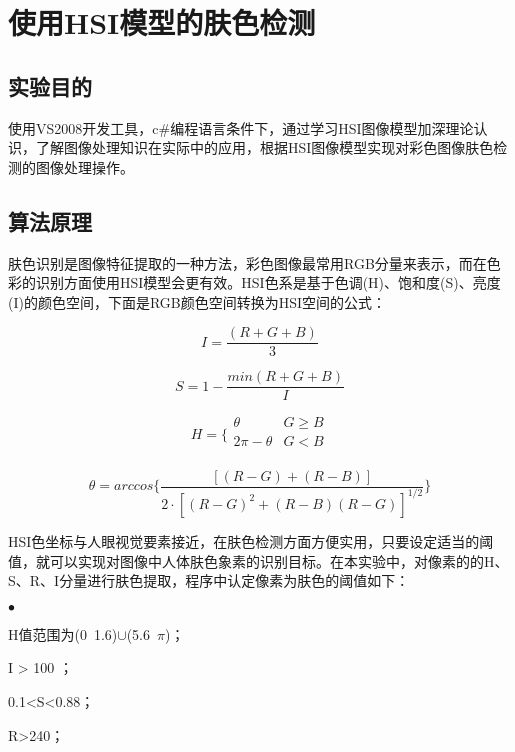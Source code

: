 ﻿\documentclass[12pt,a4paper,oneside]{book}
\begin{document}
\thispagestyle{empty}%
\setcounter{chapter}{5} 
\chapter{使用HSI模型的肤色检测}
\section{实验目的}
使用VS2008开发工具，c\#编程语言条件下，通过学习HSI图像模型加深理论认识，了解图像处理知识在实际中的应用，根据HSI图像模型实现对彩色图像肤色检测的图像处理操作。
\section{算法原理} 
肤色识别是图像特征提取的一种方法，彩色图像最常用RGB分量来表示，而在色彩的识别方面使用HSI模型会更有效。HSI色系是基于色调(H)、饱和度(S)、亮度(I)的颜色空间，下面是RGB颜色空间转换为HSI空间的公式：
 
\begin{displaymath}
I=\frac{(R + G + B)}{3}
\end{displaymath}

\begin{displaymath}
S=1-\frac{min(R + G + B)}{I}
\end{displaymath}

\begin{displaymath}
H=\bigg\{ \begin{array}{ll}
\theta& G \geq B  \\
2\pi-\theta &  G<B  \\
\end{array} 
\end{displaymath} 

\begin{displaymath}
\theta=arccos\bigg\{\frac{[(R-G)+(R-B)]}{2\cdot[(R-G)^2+(R-B)(R-G)]^{1/2}}\bigg\}
\end{displaymath}

HSI色坐标与人眼视觉要素接近，在肤色检测方面方便实用，只要设定适当的阈值，就可以实现对图像中人体肤色象素的识别目标。在本实验中，对像素的的H、S、R、I分量进行肤色提取，程序中认定像素为肤色的阈值如下：
\newlength{\mmfontsize}
\setlength{\mmfontsize}{11pt}
\setlength{\parskip}{0pt}
\renewcommand{\labelitemii}{$\circ$}
\newcommand{\listparam}{\setlength{\parsep}{\parskip}
\setlength{\itemsep}{0ex plus 0.1ex}
\setlength{\labelwidth}{2\mmfontsize}
\setlength{\labelsep}{.5\mmfontsize}
\setlength{\topsep}{0pt}
\setlength{\partopsep}{0pt}
\setlength{\leftmargin}{4\mmfontsize}
} 
\begin{list}{$\bullet$}{\listparam}
\item H值范围为(0~1.6)$\cup$(5.6~$\pi$)；
\item I  > 100 ；
\item 0.1<S<0.88；
\item R>240；
\end{list} 
\end{document}
